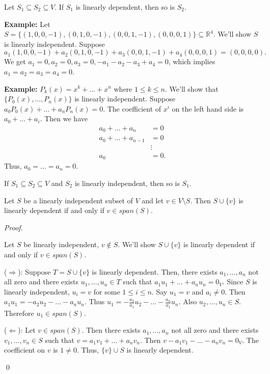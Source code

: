 \documentclass[12pt]{article}
\newenvironment{theorem}[2][Theorem]{\begin{trivlist}
\item[\hskip \labelsep {\bfseries #1}\hskip \labelsep {\bfseries #2.}]}{\end{trivlist}}
\newenvironment{corollary}[2][Corollary]{\begin{trivlist}
\item[\hskip \labelsep {\bfseries #1}\hskip \labelsep {\bfseries #2}]}{\end{trivlist}}
\newenvironment{sol}
    {\emph{Proof.}
    }
    {
    \qed
    }
\begin{document}
\begin{theorem}{1.6}
Let $S_1 \subseteq S_2 \subseteq V$. If $S_1$ is linearly dependent, then so is $S_2$.
\end{theorem}

\textbf{Example:} Let $S = \{(1, 0, 0, -1), (0, 1, 0, -1), (0, 0, 1, -1), (0, 0, 0, 1)\} \subseteq \mathbb{R}^4$. We'll show $S$ is linearly independent. Suppose $$a_1(1, 0, 0, -1) + a_2(0, 1, 0, -1) + a_3(0, 0, 1, -1) + a_4(0, 0, 0, 1) = (0, 0, 0, 0).$$ We get $a_1 = 0, a_2 = 0, a_3 = 0, -a_1 - a_2 - a_3 + a_4 = 0$, which implies $a_1 = a_2 = a_3 = a_4 = 0$.

\vspace{1em}

\textbf{Example:} $P_k(x) = x^k + \dots + x^n$ where $1 \leq k \leq n$. We'll show that $\{P_0(x), \dots, P_n(x)\}$ is linearly independent. Suppose $a_0P_0(x) + \dots + a_nP_n(x) = 0$. The coefficient of $x^i$ on the left hand side is $a_0 + \dots + a_i$. Then we have \begin{align*}
    a_0 + \dots + a_n &= 0 \\
    a_0 + \dots + a_{n-1} &= 0 \\
    &\vdots \\
    a_0 &= 0.
\end{align*}
Thus, $a_0 = \dots = a_n = 0$.

\begin{corollary}{8}
If $S_1 \subseteq S_2 \subseteq V$ and $S_2$ is linearly independent, then so is $S_1$.
\end{corollary}

\begin{theorem}{1.7}
Let $S$ be a linearly independent subset of $V$ and let $v \in V \setminus S$. Then $S \cup \{v\}$ is linearly dependent if and only if $v \in span(S)$.
\end{theorem}

\begin{sol}
Let $S$ be linearly independent, $v \not\in S$. We'll show $S \cup \{v\}$ is linearly dependent if and only if $v \in span(S)$.

($\Longrightarrow$): Suppose $T = S \cup \{v\}$ is linearly dependent. Then, there exists $a_1, \dots, a_n$ not all zero and there exists $u_1, \dots, u_n \in T$ such that $a_1u_1 + \dots + a_nu_n = 0_V$. Since $S$ is linearly independent, $u_i = v$ for some $1 \leq i \leq n$. Say $u_1 = v$ and $a_i \neq 0$. Then $a_1u_1 = -a_2u_2 - \dots - a_nu_n$. Thus $u_1 = -\frac{a_2}{a_1}u_2 - \dots - \frac{a_n}{a_1}u_n$. Also $u_2, \dots, u_n \in S$. Therefore $u_1 \in span(S)$.

($\Longleftarrow$): Let $v \in span(S)$. Then there exists $a_1, \dots, a_n$ not all zero and there exists $v_1, \dots, v_n \in S$ such that $v = a_1v_1 + \dots + a_nv_n$. Then $v - a_1v_1 - \dots - a_nv_n = 0_V$. The coefficient on $v$ is $1 \neq 0$. Thus, $\{v\} \cup S$ is linearly dependent.
\end{sol}
\end{document}
